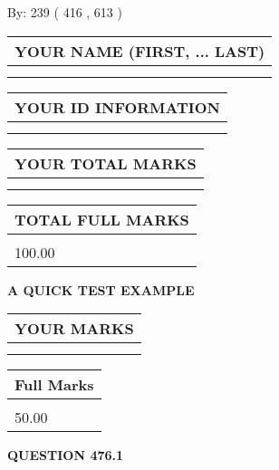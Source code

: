 \documentclass[12pt]{article}
\begin{document}
   
\hspace{1.0in} By: 
 239 ( 416 ,  613 )
   
   
   
   
\newpage 
\setcounter{page}{ 
   476001 } 
   
   
   
   
\noindent\begin{tabular}{|l|}
\hline
YOUR NAME (FIRST, ... LAST)  \\
\hline
 \\ 
 \\ 
\hline
\end{tabular}
\hspace{0.05in} \begin{tabular}{|l|}
\hline
 YOUR   ID   INFORMATION  \\
\hline
 \\ 
 \\ 
\hline
\end{tabular}
   
   
\vspace{0.2in}\noindent\begin{tabular}{|l|}
\hline
YOUR TOTAL MARKS  \\
\hline
 \\ 
 \\ 
\hline
\end{tabular}
\hspace{0.05in} \begin{tabular}{|l|}
\hline
TOTAL FULL MARKS  \\
\hline
 \\ 
100.00 \\
\hline
\end{tabular}
   
   
 \vspace{0.2in}
{\LARGE {\textbf{ A QUICK TEST EXAMPLE}}}
   
   
  
\vspace{0.2in}
  
\noindent\begin{tabular}{|l|}
\hline
 YOUR MARKS  \\
\hline
 \\ 
 \\ 
\hline
\end{tabular}
\hspace{0.05in} \begin{tabular}{|l|}
\hline
 Full Marks  \\
\hline
 \\ 
50.00 \\
\hline
\end{tabular}
{\textbf{\Large{QUESTION
476.1 
}}}
  
\end{document}
